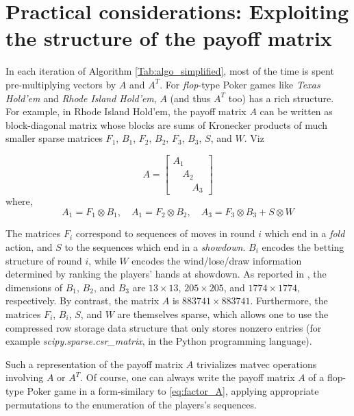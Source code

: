 \documentclass{article} %
\begin{document}
\section{Practical considerations: Exploiting the structure of the payoff matrix}
In each iteration of Algorithm \ref{Tab:algo_simplified}, most of the time is spent
pre-multiplying vectors by $A$ and $A^T$. For \textit{flop}-type Poker games like \textit{Texas Hold'em} and  \textit{Rhode Island Hold'em}, $A$ (and thus $A^T$ too) has a rich structure. For example, in Rhode Island Hold'em, the payoff matrix $A$ can be written as block-diagonal matrix whose blocks are sums of Kronecker products of much smaller sparse matrices \cite{hoda2010smoothing} $F_1$, $B_1$, $F_2$, $B_2$, $F_3$, $B_3$, $S$, and $W$. Viz

\begin{equation}
  A = \begin{bmatrix}A_1\hspace{2em}\\\hspace{1em}A_2\hspace{1em}\\\hspace{2em}A_3\end{bmatrix}
\label{eq:factor_A}
\end{equation}
where,
\begin{equation}
A_1 = F_1 \otimes B_1, \hspace{1em} A_1 = F_2 \otimes B_2, \hspace{1em} A_3 = F_3 \otimes B_3 + S \otimes W
\end{equation}

The matrices $F_i$ correspond to sequences of moves in round $i$ which end in a \textit{fold} action, and $S$ to the sequences which end in a \textit{showdown}. $B_i$ encodes the betting structure of round $i$, while $W$ encodes the wind/lose/draw information determined by ranking the players' hands at showdown. As reported in \cite{hoda2010smoothing}, the dimensions of $B_1$, $B_2$, and $B_3$ are $13 \times 13$, $205 \times 205$, and $1774 \times 1774$, respectively. By
contrast, the matrix $A$ is $883741 \times 883741$. Furthermore, the matrices $F_i$, $B_i$,
$S$, and $W$ are themselves sparse, which allows one to use the compressed row storage data structure that only stores nonzero entries (for example \textit{scipy.sparse.csr\_matrix}, in the Python programming language).

Such a representation of the payoff matrix $A$ trivializes matvec operations involving $A$ or $A^T$. Of course, one can always write the payoff matrix $A$ of a flop-type Poker game in a form-similary to \eqref{eq:factor_A}, applying appropriate permutations to the enumeration of the players's sequences.
\end{document}
